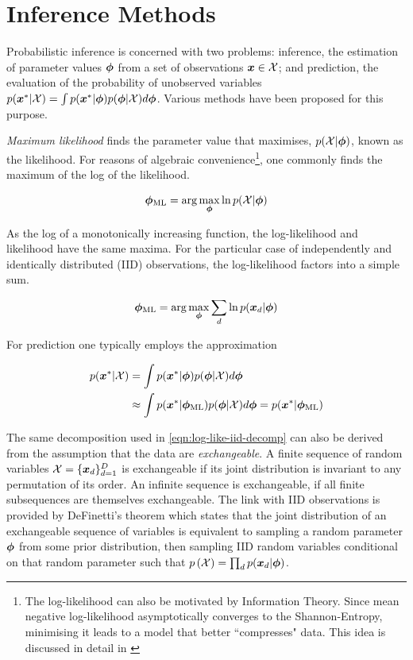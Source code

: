 \section{Inference Methods}

Probabilistic inference is concerned with two problems: inference, the estimation of parameter values ${ \bm \phi }$ from a set of observations $\bm x \in { \mathcal{X} }$; and prediction, the evaluation of the probability of unobserved variables $p({ \bm x^{*} } | { \mathcal{X} }) = \int p({ \bm x^{*} } | { \bm \phi }) p({ \bm \phi } | { \mathcal{X} }) d{ \bm \phi }$. Various methods have been proposed for this purpose.


\emph{Maximum likelihood} finds the parameter value that maximises, $p({ \mathcal{X} }|{ \bm \phi })$, known as the likelihood. For reasons of algebraic convenience\footnote{The log-likelihood can also be motivated by Information Theory. Since mean negative log-likelihood asymptotically converges to the Shannon-Entropy, minimising it leads to a model that better ``compresses" data. This idea is discussed in detail in \cite{MacKay2005InfoTheory} }, one commonly finds the maximum of the log of the likelihood.

\begin{align}
{ { {  \bm \phi  } }_{\text{ML}} } = \arg \max_{{ \bm \phi }} \ln p({ \mathcal{X} } | { \bm \phi })
\end{align}

As the log of a monotonically increasing function, the log-likelihood and likelihood have the same maxima. For the particular case of independently and identically distributed (IID) observations, the log-likelihood factors into a simple sum.

\begin{align}
{ { {  \bm \phi  } }_{\text{ML}} } = \arg \max_{{ \bm \phi }} \sum_d \ln p({ \bm x_d } | { \bm \phi }) \label{eqn:log-like-iid-decomp}
\end{align}


For prediction one typically employs the approximation

\begin{align}
p({ \bm x^{*} } | { \mathcal{X} }) 
&= \int p({ \bm x^{*} } | { \bm \phi }) p({ \bm \phi } | { \mathcal{X} }) d{ \bm \phi } \label{eqn:ml-prediction}\\
&\approx \int p({ \bm x^{*} } | { {{ \bm \phi }}_{\text{ML}} }) p({ \bm \phi } | { \mathcal{X} }) d{ \bm \phi }
=  p({ \bm x^{*} } | { {{ \bm \phi }}_{\text{ML}} })
\end{align}

The same decomposition used in \eqref{eqn:log-like-iid-decomp} can also be derived from the assumption that the data are \emph{exchangeable}.  A finite sequence of random variables ${ \mathcal{X} } = \{{ \bm x_d }\}_{d=1}^{D}$ is exchangeable if its joint distribution is invariant to any permutation of its order. An infinite sequence is exchangeable, if all finite subsequences are themselves exchangeable. The link with IID observations is provided by DeFinetti's theorem\cite{DeFinetti1975}\cite{Hewitt1955} which states that the joint distribution of an exchangeable sequence of variables is equivalent to sampling a random parameter ${ \bm \phi }$ from some prior distribution, then sampling IID random variables conditional on that random parameter such that $p\left({ \mathcal{X} }\right) = \prod_d p({ \bm x_d } | { \bm \phi })$.

